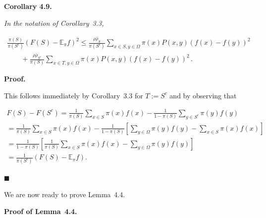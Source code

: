 

\par\medskip\noindent\textbf{\textbf{Corollary 4.9}\textbf{.}}\par



\emph{In the notation of Corollary 3.3,}\par


\[\begin{gathered}
\displaystyle\frac{\pi(S)}{\pi(S^{c})}(F(S)-\mathbb{E}_{\pi}f)^{2} \displaystyle\leq\frac{\rho\bar{\rho}_{S}}{\pi(S^{c})}\sum_{x\in S,y\in\Omega}\pi(x)P(x,y)(f(x)-f(y))^{2} \\
\displaystyle\quad\quad+\frac{\rho\bar{\rho}_{S^{c}}}{\pi(S)}\sum_{x\in T,y\in\Omega}\pi(x)P(x,y)(f(x)-f(y))^{2}\,.
\end{gathered}\]






\par\medskip\noindent\textbf{Proof.}\par



This follows immediately by Corollary 3.3 for $T:=S^{c}$ and by observing that\par


\[\begin{gathered}
\displaystyle F(S)-F(S^{c}) \displaystyle=\frac{1}{\pi(S)}\sum_{x\in S}\pi(x)f(x)-\frac{1}{1-\pi(S)}\sum_{y\in S^{c}}\pi(y)f(y) \\
\displaystyle=\frac{1}{\pi(S)}\sum_{x\in S}\pi(x)f(x)-\frac{1}{1-\pi(S)}\left[\sum_{y\in\Omega}\pi(y)f(y)-\sum_{x\in S}\pi(x)f(x)\right] \\
\displaystyle=\frac{1}{1-\pi(S)}\left[\frac{1}{\pi(S)}\sum_{x\in S}\pi(x)f(x)-\sum_{y\in\Omega}\pi(y)f(y)\right] \\
\displaystyle=\frac{1}{\pi(S^{c})}(F(S)-\mathbb{E}_{\pi}f).
\end{gathered}\]


\ensuremath{\blacksquare}\par





We are now ready to prove Lemma 4.4.\par




\par\medskip\noindent\textbf{Proof of Lemma 4.4.}\par




